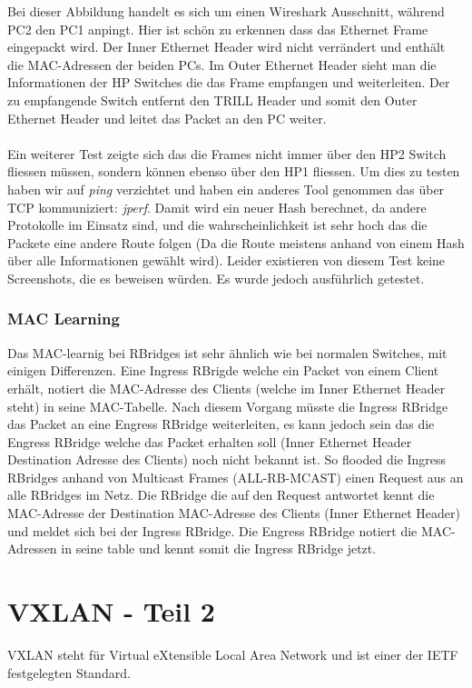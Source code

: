 \documentclass[a4,12pt]{scrartcl}
\begin{document}
\noindent Bei dieser Abbildung handelt es sich um einen Wireshark Ausschnitt, während PC2 den PC1 anpingt. Hier ist schön zu erkennen dass das Ethernet Frame eingepackt wird. Der Inner Ethernet Header wird nicht verrändert und enthält die MAC-Adressen der beiden PCs. Im Outer Ethernet Header sieht man die Informationen der HP Switches die das Frame empfangen und weiterleiten. Der zu empfangende Switch entfernt den TRILL Header und somit den Outer Ethernet Header und leitet das Packet an den PC weiter. \\\\
Ein weiterer Test zeigte sich das die Frames nicht immer über den HP2 Switch fliessen müssen, sondern können ebenso über den HP1 fliessen.  Um dies zu testen haben wir auf \textit{ping} verzichtet und haben ein anderes Tool genommen das über TCP kommuniziert: \textit{jperf}. Damit wird ein neuer Hash  berechnet, da andere Protokolle im Einsatz sind, und die wahrscheinlichkeit ist sehr hoch das die Packete eine andere Route folgen (Da die Route meistens anhand von einem Hash über alle Informationen gewählt wird). Leider existieren von diesem Test keine Screenshots, die es beweisen würden. Es wurde jedoch ausführlich getestet.  
\newpage

\subsubsection{MAC Learning} 
Das MAC-learnig bei RBridges ist sehr ähnlich wie bei normalen Switches, mit einigen Differenzen. Eine Ingress RBrigde welche ein Packet von einem Client erhält, notiert die MAC-Adresse des Clients (welche im Inner Ethernet Header steht) in seine MAC-Tabelle. Nach diesem Vorgang müsste die Ingress RBridge das Packet an eine Engress RBridge weiterleiten, es kann jedoch sein das die Engress RBridge welche das Packet erhalten soll (Inner Ethernet Header Destination Adresse des Clients) noch nicht bekannt ist. So flooded die Ingress RBridges anhand von Multicast Frames (ALL-RB-MCAST) einen Request aus an alle RBridges im Netz. Die RBridge die auf den Request antwortet kennt die MAC-Adresse der Destination MAC-Adresse des Clients (Inner Ethernet Header) und meldet sich bei der Ingress RBridge. Die Engress RBridge notiert die MAC-Adressen in seine table und kennt somit die Ingress RBridge jetzt. 

\newpage
\section{VXLAN - Teil 2}
VXLAN steht für Virtual eXtensible Local Area Network und ist einer der IETF festgelegten Standard. 
\end{document}
